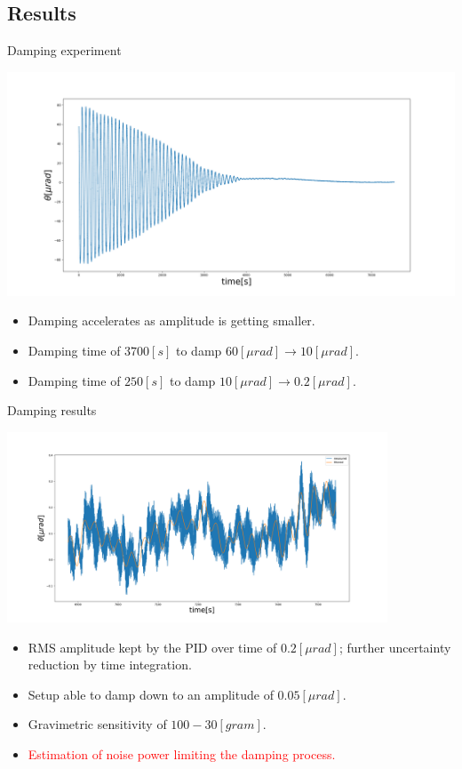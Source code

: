 \documentclass{beamer}
\begin{document}
\subsection{Results}
\begin{frame}{Damping experiment}
	\begin{center}		
		\includegraphics[width=1\textwidth,keepaspectratio]{measured oscillation angle.png}
	\end{center}
	\begin{itemize}	
		
		\item Damping accelerates as amplitude is getting smaller.
		\item Damping time of $3700[s]$ to damp  $ 60 [\mu rad] \rightarrow 10[\mu rad] $.
		\item Damping time of $250[s]$ to damp  $ 10 [\mu rad] \rightarrow 0.2[\mu rad] $.

						
	\end{itemize}
\end{frame}
\begin{frame}{Damping results}
	\begin{center}		
		\includegraphics[width=0.85\textwidth,keepaspectratio]{measured oscillation angle1.png}
	\end{center}
	\begin{itemize}	
		\item RMS amplitude kept by the PID over time of $ 0.2 [\mu rad]$; further uncertainty reduction by time integration.	
		\item Setup able to damp down to an amplitude of $0.05[\mu rad]$.
		\item Gravimetric sensitivity of $100-30[gram]$.
		\item \textcolor{red}{Estimation of noise power limiting the damping process.}
					
	\end{itemize}
\end{frame}
\end{document}

